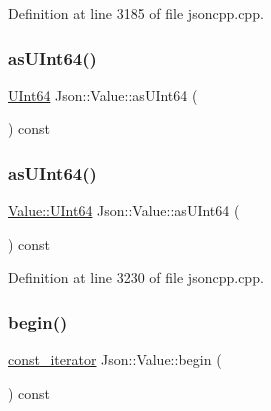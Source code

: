 Definition at line 3185 of file jsoncpp.\+cpp.

\hypertarget{class_json_1_1_value_aca53fe8b4bdd385010d431e5d01b3987}{}\label{class_json_1_1_value_aca53fe8b4bdd385010d431e5d01b3987} 
\subsubsection{\texorpdfstring{as\+U\+Int64()}{asUInt64()}\hspace{0.1cm}{\footnotesize\ttfamily [1/2]}}
{\footnotesize\ttfamily \hyperlink{class_json_1_1_value_a8b62564be8c087c6d18de180ff4e13e3}{U\+Int64} Json\+::\+Value\+::as\+U\+Int64 (\begin{DoxyParamCaption}{ }\end{DoxyParamCaption}) const}

\hypertarget{class_json_1_1_value_a0e44a5a4cd0c099f9570dfa25813eb60}{}\label{class_json_1_1_value_a0e44a5a4cd0c099f9570dfa25813eb60} 
\subsubsection{\texorpdfstring{as\+U\+Int64()}{asUInt64()}\hspace{0.1cm}{\footnotesize\ttfamily [2/2]}}
{\footnotesize\ttfamily \hyperlink{class_json_1_1_value_a8b62564be8c087c6d18de180ff4e13e3}{Value\+::\+U\+Int64} Json\+::\+Value\+::as\+U\+Int64 (\begin{DoxyParamCaption}{ }\end{DoxyParamCaption}) const}



Definition at line 3230 of file jsoncpp.\+cpp.

\hypertarget{class_json_1_1_value_a42f2fac40a6b5f4ef6abe0a5c314d1ba}{}\label{class_json_1_1_value_a42f2fac40a6b5f4ef6abe0a5c314d1ba} 
\subsubsection{\texorpdfstring{begin()}{begin()}\hspace{0.1cm}{\footnotesize\ttfamily [1/4]}}
{\footnotesize\ttfamily \hyperlink{class_json_1_1_value_af92282ca92b58b320debd486afb7696a}{const\+\_\+iterator} Json\+::\+Value\+::begin (\begin{DoxyParamCaption}{ }\end{DoxyParamCaption}) const}

